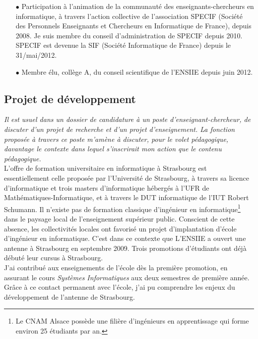 \documentclass[11pt]{article}
\begin{document}
\begin{itemize}
\item[$\bullet$] 
Participation à l'animation de la communauté des enseignants-chercheurs en informatique, à travers 
l'action collective de l'association SPECIF (Société des Personnels Enseignants et Chercheurs 
en Informatique de France), depuis 2008. Je suis membre du conseil d'administration de SPECIF depuis 
2010. SPECIF est devenue la SIF (Société Informatique de France) depuis le 31/mai/2012.\\

\item[$\bullet$] 
Membre élu, collège A, du conseil scientifique de l'ENSIIE depuis juin 2012. 
\vspace{1cm}
\end{itemize}




\subsection{Projet de développement}

\textit{%
Il est usuel dans un dossier de candidature à un poste d'enseignant-chercheur,
de discuter d'un  projet de recherche et d'un projet d'enseignement. La
fonction proposée à travers ce poste m'amène à discuter, pour le volet
pédagogique, davantage le contexte dans lequel s'inscrirait mon action
que le contenu pédagogique.}\\

L'offre de formation universitaire en informatique à Strasbourg est 
essentiellement celle proposée par l'Université de Strasbourg, à travers sa 
licence d'informatique et trois masters d'informatique hébergés à l'UFR de
Mathématiques-Informatique, et à travers le DUT informatique de l'IUT
Robert Schumann. Il n'existe pas de formation classique d'ingénieur en 
informatique\footnote{Le CNAM Alsace possède une filière d'ingénieurs en 
apprentissage qui forme environ 25 étudiants par an.}
dans le paysage local de l'enseignement supérieur public.
Conscient de cette absence, les collectivités locales ont favorisé un projet
d'implantation d'école d'ingénieur en informatique. C'est dans ce contexte
que L'ENSIIE a ouvert une antenne à Strasbourg en septembre 2009. 
Trois promotions d'étudiants ont déjà débuté leur cursus à Strasbourg.\\

J'ai contribué aux enseignements de l'école dès la première promotion,
en assurant le cours \emph{Systèmes Informatiques} aux deux semestres
de première année. Grâce à ce contact permanent avec l'école, j'ai pu
comprendre les enjeux du développement de l'antenne de Strasbourg.
\end{document}
